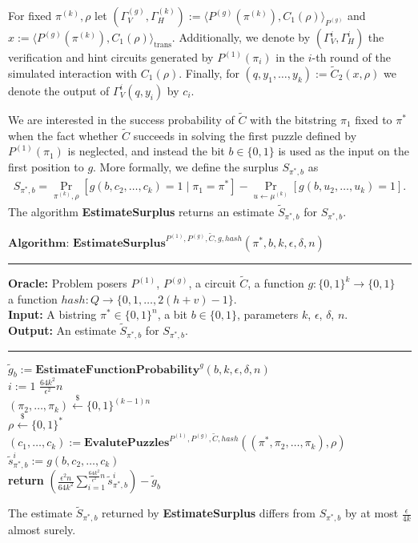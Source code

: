 For fixed $\pi^{(k)}, \rho$ let $(\Gamma_V^{(g)}, \Gamma_H^{(k)}) := \langle P^{(g)}(\pi^{(k)}), C_1(\rho) \rangle_{P^{(g)}}$
and $x := \langle P^{(g)}(\pi^{(k)}), C_1(\rho) \rangle_{\text{trans}}$.
Additionally, we denote by $(\Gamma_V^{i}, \Gamma_H^{i})$ the verification and hint circuits generated by $P^{(1)}(\pi_i)$ in the $i$-th
round of the simulated interaction with $C_1(\rho)$.
Finally, for $(q,y_1, \dots, y_k) := \widetilde{C}_2(x, \rho)$ we denote the output of $\Gamma_V^i(q,y_i)$ by $c_i$.

We are interested in the success probability of $\widetilde{C}$ with the bitstring $\pi_1$ fixed to $\pi^*$ when
the fact whether $\widetilde{C}$ succeeds in solving the first puzzle defined by $P^{(1)}(\pi_1)$ is neglected, and
instead the bit $b \in \{0,1\}$ is used as the input on the first position to $g$.
More formally, we define the surplus $S_{\pi^*, b}$ as
\begin{align}
  \label{eq:s_pi_b}
S_{\pi^*, b} = \underset{\pi^{(k)}, \rho}{\Pr}\left[g(b, c_2, \dots, c_k) = 1 \mid \pi_1 = \pi^*\right] - \underset{u \leftarrow \mu^{(k)}}{\Pr}\left[g(b, u_2, \dots, u_k) = 1\right].
\end{align}
%
The algorithm \textbf{EstimateSurplus} returns an estimate $\widetilde{S}_{\pi^*, b}$ for $S_{\pi^*, b}$.
%
\begin{codeblock}
  $\textbf{Algorithm: EstimateSurplus}^{P^{(1)}, P^{(g)}, \widetilde{C}, g, hash}(\pi^*, b, k, \epsilon, \delta, n)$
  \medskip
  \hrule
  \medskip
  \textbf{Oracle:} Problem posers $P^{(1)}$, $P^{(g)}$, a circuit $\widetilde{C}$, a function $g: \{0,1\}^{k} \rightarrow \{0,1\}$ \\
  \IndII a function $hash : Q \rightarrow \{0,1,\dots, 2(h+v)-1\}$.\\
  \textbf{Input:} A bistring $\pi^* \in \{0,1\}^{n}$, a bit $b \in \{0,1\}$, parameters $k$, $\epsilon$, $\delta$, $n$.\\
  \textbf{Output:} An estimate $\widetilde{S}_{\pi^*, b}$ for $S_{\pi^*, b}$.
  \medskip\hrule\medskip
  $\widetilde{g}_b := \textbf{EstimateFunctionProbability}^{g}(b, k, \epsilon, \delta, n)$ \\
  \For $i:=1$ \To $\frac{64k^2}{\epsilon^2}n$ \Do \\
  \IndI $(\pi_{2}, \dots, \pi_k) \xleftarrow{\$} \{0,1\}^{(k-1)n}$\\
  \IndI $\rho \xleftarrow{\$} \{0,1\}^{*}$\\
  \IndI $(c_1, \dots, c_k) := \textbf{EvalutePuzzles}^{P^{(1)}, P^{(g)}, \widetilde{C}, hash}((\pi^*, \pi_2, \dots, \pi_k), \rho)$\\
  \IndI $\widetilde{s}_{\pi^*,b}^i := g(b, c_{2}, \dots, c_k)$\\
  \textbf{return} $\left(\frac{\epsilon^2 n}{64k^2} \sum_{i=1}^{\frac{64k^2}{\epsilon^2} n} \widetilde{s}_{\pi^*,b}^i \right) - \widetilde{g}_b$\\
\end{codeblock}
%
\begin{lemma}
  \label{lemma:surplus_estimate}
The estimate $\widetilde{S}_{\pi^*,b}$ returned by \textbf{EstimateSurplus} differs from $S_{\pi^*, b}$ by at most $\frac{\epsilon}{4k}$ almost surely.
\end{lemma}

